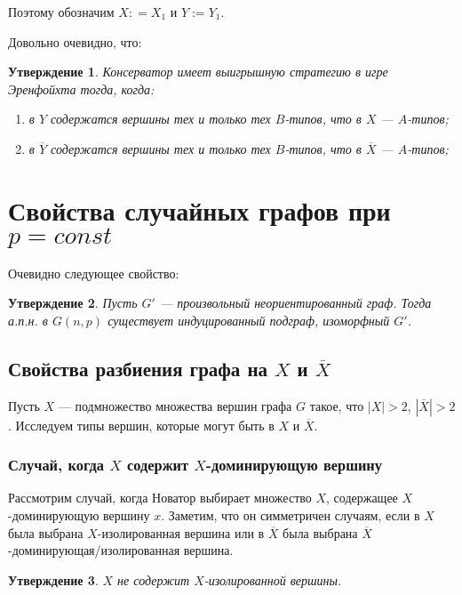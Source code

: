 \documentclass{article}
\newtheorem*{sttm}{Утверждение}
\begin{document}
	Поэтому обозначим $X : = X_1$ и $Y := Y_1$.
	
	Довольно очевидно, что:
	
	\begin{sttm}
		Консерватор имеет выигрышную стратегию в игре Эренфойхта тогда, когда:
		\begin{enumerate}
			\item в $Y$ содержатся вершины тех и только тех $B$-типов, что в $X$ --- $A$-типов;
			\item в $\overline{Y}$ содержатся вершины тех и только тех $B$-типов, что в $\overline{X}$ --- $A$-типов;
		\end{enumerate}
	\end{sttm}
	
	
	\section{Свойства случайных графов при $p = const$}
	
	Очевидно следующее свойство:
	
	\begin{sttm}
		Пусть $G'$ --- произвольный неориентированный граф. Тогда а.п.н. в $G(n,p)$ существует индуцированный подграф, изоморфный $G'$.
	\end{sttm}
	
	\subsection{Свойства разбиения графа на $X$ и $\overline{X}$}
	
	Пусть $X$ --- подмножество множества вершин графа $G$ такое, что $|X| > 2$, $|\overline{X}| > 2$. Исследуем типы вершин, которые могут быть в $X$ и $\overline{X}$.
	
	\subsubsection{Случай, когда $X$ содержит $X$-доминирующую вершину}
	
	Рассмотрим случай, когда Новатор выбирает множество $X$, содержащее $X$-доминирующую вершину $x$. Заметим, что он симметричен случаям, если в $X$ была выбрана $X$-изолированная вершина или в $\overline{X}$ была выбрана $\overline{X}$-доминирующая/изолированная вершина.
	
	\begin{sttm}
		$X$ не содержит $X$-изолированной вершины.
	\end{sttm}
	
\end{document}
